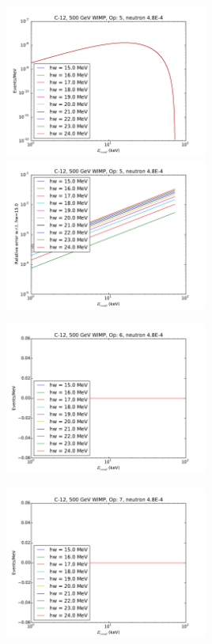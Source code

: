 \documentclass{article}
\begin{document}
\includegraphics[width=0.5\textwidth]{c12-hw-o5}
\includegraphics[width=0.5\textwidth]{c12-hw-o5-relerr}

\includegraphics[width=0.5\textwidth]{c12-hw-o6}

\includegraphics[width=0.5\textwidth]{c12-hw-o7}
\end{document}
